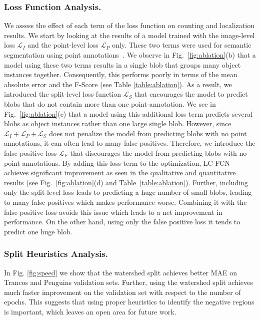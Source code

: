 \documentclass[runningheads]{llncs}
\begin{document}
\subsubsection{Loss Function Analysis.}
We assess the effect of each term of the loss function on counting and localization results. We start by looking at the results of a model trained with the image-level loss $\mathcal{L}_I$ and the point-level loss $\mathcal{L}_P$ only. These two terms were used for semantic segmentation using point annotations~\cite{bearman2016s}. We observe in Fig.~\ref{fig:ablation}(b) that a model using these two terms results in a single blob that groups many object instances together. Consequently, this performs poorly in terms of the mean absolute error and the F-Score (see Table \ref{table:ablation}).  As a result, we introduced the split-level loss function $\mathcal{L}_S$ that encourages the model to predict blobs that do not contain more than one point-annotation. We see in Fig.~\ref{fig:ablation}(c) that a model using this additional loss term predicts several blobs as object instances rather than one large single blob. However,  since $\mathcal{L}_I + \mathcal{L}_P  + \mathcal{L}_S$ does not penalize the model from predicting blobs with no point annotations, it can often lead to many false positives. Therefore, we introduce the false positive loss $\mathcal{L}_F$ that discourages the model from predicting blobs with no point annotations. By adding this loss term to the optimization, LC-FCN achieves significant improvement as seen in the qualitative and quantitative results (see Fig.~\ref{fig:ablation}(d) and Table~\ref{table:ablation}). Further, including only the split-level loss leads to predicting a huge number of small blobs, leading to many false positives which makes performance worse. Combining it with the false-positive loss avoids this issue which leads to a net improvement in performance. On the other hand, using only the false positive loss it tends to predict one huge blob.

\subsubsection{Split Heuristics Analysis.}
In Fig. \ref{fig:speed}  we show that the watershed split achieves better MAE on Trancos and Penguins validation sets. Further, using the watershed split achieves much faster improvement on the validation set with respect to the number of epochs. This suggests that using proper heuristics to identify the negative regions is important, which leaves an open area for future work.
\end{document}

